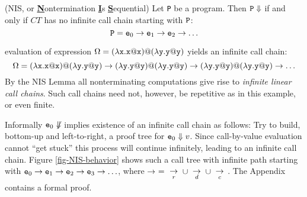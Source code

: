 \documentclass{LMCS}
\newcommand{\fl}{\noindent}
\newcommand{\blem}{\begin{lem}}
\newcommand{\elem}{\end{lem}}
\theoremstyle{definition}\newtheorem{env}[thm]{Environment}
\newcommand{\tosub}[1]{\raisebox{-6.0pt}{$\ \stackrel{\textstyle\to}{\vrule height4.5 pt width0 pt
    depth2.5 pt \smash{\scriptstyle#1}}\ $}}
\begin{document}
\blem \label{lem-NIS-standard} {\rm (}NIS, or {\bf\underline N}ontermination 
{\bf\underline I}s 
{\bf\underline S}equential{\rm )} 
Let {\tt P} be a program. 
Then ${\tt P}\Downarrow$  if and only  if $CT$ has no infinite call chain starting with ${\tt P}$:
$$
{\tt P} = {\tt e}_0\to{\tt e}_1\to{\tt e}_2\to \ldots 
$$
\elem

\fl{\em Example:} evaluation of expression
$\Omega=(\lambda{\tt x.x@x}){\tt@}(\lambda{\tt y.y@y})$ 
yields an infinite call chain:
$$
\Omega=(\lambda{\tt x.x@x}){\tt@}(\lambda{\tt y.y@y})\to(\lambda{\tt y.y@y}){\tt@}(\lambda{\tt y.y@y})\to
  (\lambda{\tt y.y@y}){\tt@}(\lambda{\tt y.y@y})\to\ldots
$$
By the NIS Lemma all nonterminating computations
give rise to   {\em infinite linear call chains}.
Such call chains need not, however, be repetitive as in this example, 
or even finite. 


Informally ${\tt e}_0\not\Downarrow$ 
implies existence of an infinite call chain as follows:
Try to build,  
bottom-up and left-to-right,  a 
proof tree for ${\tt e}_0\Downarrow v$.
Since call-by-value evaluation cannot ``get stuck''
this process will continue infinitely, leading to an infinite call chain.
Figure \ref{fig-NIS-behavior} shows 
such a call tree with infinite path starting with ${\tt e}_0\to{\tt e}_1\to{\tt e}_2\to{\tt e}_3\to\ldots$, 
where $\to\ =\tosub{r}\cup\tosub{d}\cup\tosub{c}$.
The Appendix contains a formal proof. 
\end{document}
